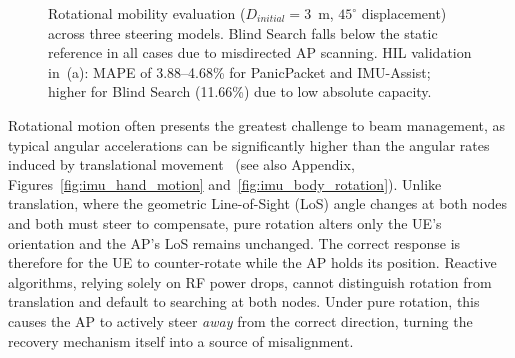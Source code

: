 \documentclass[fleqn,10pt]{wlscirep}
\newcommand{\legline}[2]{%
    \tikz[Blind Search=-0.5ex]{
        \draw[#1, #2, line width=1.5pt] (0,0) -- (0.5,0);
    }%
}
\newcommand{\legmark}[2]{%
    \tikz[Blind Search=-0.5ex]{
        \node[#2, fill=#1, draw=#1, inner sep=2pt, scale=0.8] at (0,0) {};
    }%
}
\begin{document}
\begin{figure}[ht!]
    \caption{Rotational mobility evaluation ($D_{initial} = 3$~m, $45^\circ$ displacement) across three steering models. Blind Search falls below the static reference in all cases due to misdirected AP scanning. HIL validation in~(a): MAPE of 3.88--4.68\% for PanicPacket and IMU-Assist; higher for Blind Search (11.66\%) due to low absolute capacity.}
    \label{fig:rotational_rate}
    \vspace{-5pt}
\end{figure}

Rotational motion often presents the greatest challenge to beam management, as typical angular accelerations can be significantly higher than the angular rates induced by translational movement~\cite{9391649} (see also Appendix, Figures~\ref{fig:imu_hand_motion} and~\ref{fig:imu_body_rotation}). Unlike translation, where the geometric Line-of-Sight (LoS) angle changes at both nodes and both must steer to compensate, pure rotation alters only the UE's orientation and the AP's LoS remains unchanged. The correct response is therefore for the UE to counter-rotate while the AP holds its position. Reactive algorithms, relying solely on RF power drops, cannot distinguish rotation from translation and default to searching at both nodes. Under pure rotation, this causes the AP to actively steer \emph{away} from the correct direction, turning the recovery mechanism itself into a source of misalignment.
\end{document}
